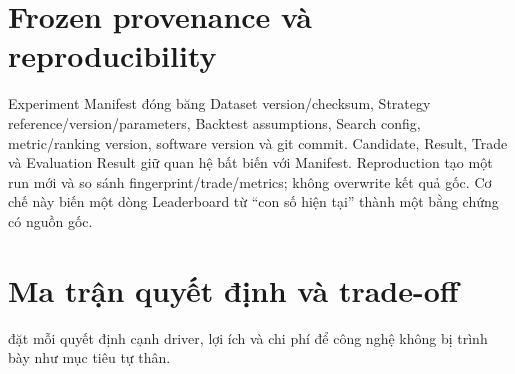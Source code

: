 \documentclass[12pt,a4paper,oneside]{report}
\begin{document}
\section{Frozen provenance và reproducibility}

Experiment Manifest đóng băng Dataset version/checksum, Strategy reference/version/parameters, Backtest assumptions, Search config, metric/ranking version, software version và git commit. Candidate, Result, Trade và Evaluation Result giữ quan hệ bất biến với Manifest. Reproduction tạo một run mới và so sánh fingerprint/trade/metrics; không overwrite kết quả gốc. Cơ chế này biến một dòng Leaderboard từ ``con số hiện tại'' thành một bằng chứng có nguồn gốc.

\section{Ma trận quyết định và trade-off}

 đặt mỗi quyết định cạnh driver, lợi ích và chi phí để công nghệ không bị trình bày như mục tiêu tự thân.
\end{document}
